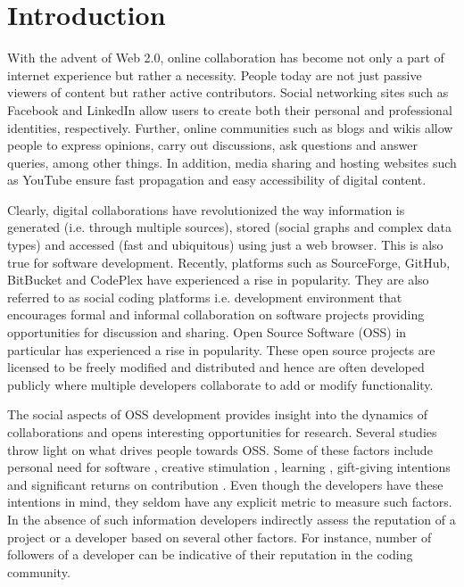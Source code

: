
\section{Introduction}
\label{sec:introduction}

With the advent of Web 2.0, online collaboration has become not only a part of internet experience but rather a necessity. People today are not just passive viewers of content but rather active contributors. Social networking sites such as Facebook and LinkedIn allow users to create both their personal and professional identities, respectively. Further, online communities such as blogs and wikis allow people to express opinions, carry out discussions, ask questions and answer queries, among other things. In addition, media sharing and hosting websites such as YouTube ensure fast propagation and easy accessibility of digital content.

Clearly, digital collaborations have revolutionized the way information is generated (i.e. through multiple sources), stored (social graphs and complex data types) and accessed (fast and ubiquitous) using just a web browser. This is also true for software development. Recently, platforms such as SourceForge, GitHub, BitBucket and CodePlex have experienced a rise in popularity. They are also referred to as social coding platforms i.e. development environment that encourages formal and informal collaboration on software projects providing opportunities for discussion and sharing. Open Source Software (OSS) in particular has experienced a rise in popularity. These open source projects are licensed to be freely modified and distributed and hence are often developed publicly where multiple developers collaborate to add or modify functionality.

The social aspects of OSS development provides insight into the dynamics of collaborations and opens interesting opportunities for research. Several studies throw light on what drives people towards OSS. Some of these factors include personal need for software \cite{Raymond1999}, creative stimulation \cite{lakhani2005}, learning \cite{Lakhani2003}, gift-giving intentions \cite{Zeitlyn2003} and significant returns on contribution \cite{ghosh2005}. Even though the developers have these intentions in mind, they seldom have any explicit metric to measure such factors. In the absence of such information developers indirectly assess the reputation of a project or a developer based on several other factors. For instance, number of followers of a developer can be indicative of their reputation in the coding community.

